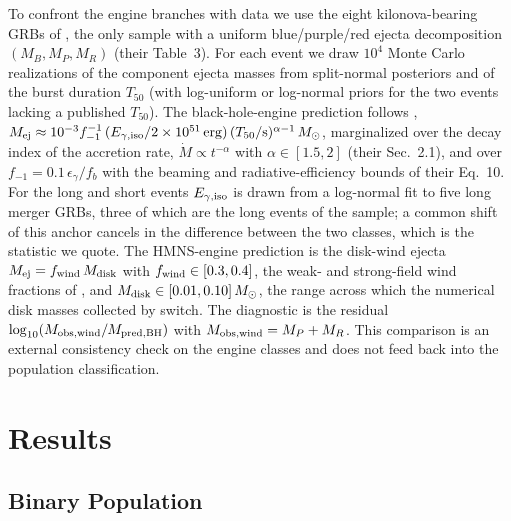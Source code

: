 \documentclass[twocolumn,apj]{openjournal}
\newcommand{\Msun}{M_\odot}
\newcommand{\Mdisk}{M_{\rm disk}}
\begin{document}
To confront the engine branches with data we use the eight kilonova-bearing GRBs
of \citet{rastinejad2024}, the only sample with a uniform blue/purple/red
ejecta decomposition $(M_B, M_P, M_R)$ (their Table~3). For each event we draw
$10^4$ Monte Carlo realizations of the component ejecta masses from split-normal
posteriors and of the burst duration $T_{50}$ (with log-uniform or log-normal
priors for the two events lacking a published $T_{50}$). The black-hole-engine
prediction follows \citet[their Eq.~11]{gottlieb2024},
$M_{\rm ej} \approx 10^{-3} f_{-1}^{-1}\,(E_{\gamma,\rm iso}/2\times10^{51}\,{\rm erg})\,(T_{50}/{\rm s})^{\alpha-1}\,\Msun$,
marginalized over the decay index of the accretion rate, $\dot M \propto t^{-\alpha}$
with $\alpha \in [1.5, 2]$ (their Sec.~2.1), and over
$f_{-1} = 0.1\,\epsilon_\gamma/f_b$ with the beaming and radiative-efficiency
bounds of their Eq.~10. For the long and short events $E_{\gamma,\rm iso}$ is
drawn from a log-normal fit to five long merger GRBs, three of which are the
long events of the sample; a common shift of this anchor cancels in the
difference between the two classes, which is the statistic we quote. The
HMNS-engine prediction is the disk-wind ejecta $M_{\rm ej} = f_{\rm wind}\,\Mdisk$
with $f_{\rm wind} \in [0.3, 0.4]$, the weak- and strong-field wind fractions of
\citet[their Sec.~3.1]{gottlieb2024}, and $\Mdisk \in [0.01, 0.10]\,\Msun$, the
range across which the numerical disk masses collected by \citet{kruger2020}
switch. The diagnostic is the residual
$\log_{10}(M_{\rm obs,wind}/M_{\rm pred,BH})$ with $M_{\rm obs,wind} = M_P + M_R$.
This comparison is an external consistency check on the engine classes and does
not feed back into the population classification.



\section{Results}
\subsection{Binary Population} \label{sec:pop}
\end{document}
